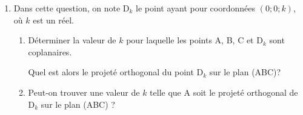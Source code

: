 \documentclass[10pt]{article}
\begin{document}
\begin{enumerate}
		\item Dans cette question, on note $\mathrm{D}_{k}$ le point ayant pour coordonnées $(0 ; 0 ; k)$, où $k$ est un réel.
		\begin{enumerate}
			\item Déterminer la valeur de $k$ pour laquelle les points A, B, C et $\mathrm{D}_{k}$ sont coplanaires.

			Quel est alors le projeté orthogonal du point D$_{k}$ sur le plan (ABC)?

			\item Peut-on trouver une valeur de $k$ telle que A soit le projeté orthogonal de $\mathrm{D}_{k}$ sur le plan (ABC) ?
		\end{enumerate}
	\end{enumerate}
\end{document}
